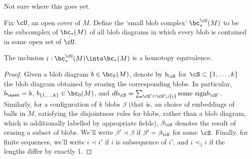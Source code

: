 Not sure where this goes yet.

Fix $\cU$, an open cover of $M$. Define the `small blob complex' $\bc^{\cU}_*(M)$ to be the subcomplex of $\bc_*(M)$ of all blob diagrams in which every blob is contained in some open set of $\cU$.

\begin{lem}
The inclusion $i: \bc^{\cU}_*(M) \into \bc_*(M)$ is a homotopy equivalence.
\end{lem}
\begin{proof}
Given a blob diagram $b \in \bc_k(M)$, denote by $b_\cS$ for $\cS \subset \{1, \ldots, k\}$ the blob diagram obtained by erasing the corresponding blobs. In particular, $b_\eset = b$, $b_{\{1,\ldots,k\}} \in \bc_0(M)$, and $d b_\cS = \sum_{\cS' = \cS'\sqcup\{i\}} \text{some sign} b_{\cS'}$.
Similarly, for a configuration of $k$ blobs $\beta$ (that is, an choice of embeddings of balls in $M$, satisfying the disjointness rules for blobs, rather than a blob diagram, which is additionally labelled by appropriate fields), $\beta_\cS$ denotes the result of erasing a subset of blobs. We'll write $\beta' \prec \beta$ if $\beta' = \beta_\cS$ for some $\cS$. Finally, for finite sequences, we'll write $i \prec i'$ if $i$ is subsequence of $i'$, and $i \prec_1 i$ if the lengths differ by exactly 1.


\end{proof}
